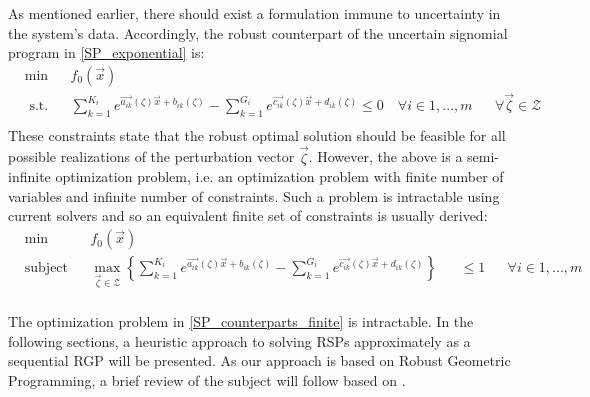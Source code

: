 As mentioned earlier, there should exist a formulation immune to
uncertainty in the system's data. Accordingly, the robust counterpart
of the uncertain signomial program in \eqref{SP_exponential} is:
\begin{equation}
\begin{aligned}
& \min && f_0\left(\vec{x}\right) \\
& \text{ s.t.} && \textstyle{\sum}_{k=1}^{K_i}e^{\vec{a_{ik}}\left(\zeta\right)\vec{x} + b_{ik}\left(\zeta\right)} - \textstyle{\sum}_{k=1}^{G_i}e^{\vec{c_{ik}}\left(\zeta\right)\vec{x} + d_{ik}\left(\zeta\right)} \leq 0 \quad \forall i \in 1,...,m && \forall \vec{\zeta} \in \mathcal{Z}\\
\end{aligned}
\label{SP_counterparts}
\end{equation}
These constraints state that the robust optimal solution should be
feasible for all possible realizations of the perturbation vector $\vec{\zeta}$.
However, the above is a semi-infinite optimization problem, i.e. an optimization
problem with finite number of variables and infinite number of constraints.
Such a problem is intractable using current solvers and so an equivalent finite
set of constraints is usually derived:
\begin{equation}
\begin{aligned}
& \min &&f_0\left(\vec{x}\right)\\
& \text{subject to} &&\max_{\vec{\zeta} \in \mathcal{Z}} \left\{\textstyle{\sum}_{k=1}^{K_i}e^{\vec{a_{ik}}\left(\zeta\right)\vec{x} + b_{ik}\left(\zeta\right)} - \textstyle{\sum}_{k=1}^{G_i}e^{\vec{c_{ik}}\left(\zeta\right)\vec{x} + d_{ik}\left(\zeta\right)}\right\} &&\leq 1 &&\forall i \in 1,...,m\\
\end{aligned}
\label{SP_counterparts_finite}
\end{equation}

The optimization problem in \eqref{SP_counterparts_finite} is intractable.
In the following sections, a heuristic approach to solving RSPs approximately
as a sequential RGP will be presented. As our approach is based on Robust
Geometric Programming, a brief review of the subject will follow based on \cite{Saab2018}.
